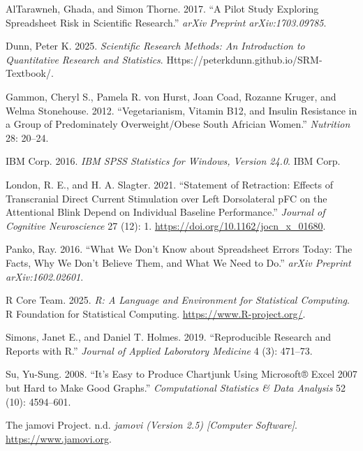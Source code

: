 \documentclass[
  11pt,
  a4paper,
]{krantz}
\newlength{\cslhangindent}
\newenvironment{CSLReferences}[2] %
 {\begin{list}{}{%
  \setlength{\itemindent}{0pt}
  \setlength{\leftmargin}{0pt}
  \setlength{\parsep}{0pt}
  \ifodd #1
   \setlength{\leftmargin}{\cslhangindent}
   \setlength{\itemindent}{-1\cslhangindent}
  \fi
  \setlength{\itemsep}{#2\baselineskip}}}
 {\end{list}}
\begin{document}
\protect{}\label{refs}
\begin{CSLReferences}{1}{1}
AlTarawneh, Ghada, and Simon Thorne. 2017. {``A Pilot Study Exploring Spreadsheet Risk in Scientific Research.''} \emph{arXiv Preprint arXiv:1703.09785}.

Dunn, Peter K. 2025. \emph{Scientific Research Methods: An Introduction to Quantitative Research and Statistics}. Https://peterkdunn.github.io/SRM-Textbook/.

{Gammon, Cheryl S., Pamela R. von Hurst, Joan Coad, Rozanne Kruger, and Welma Stonehouse}. 2012. {``Vegetarianism, Vitamin {B12}, and Insulin Resistance in a Group of Predominately Overweight/Obese {S}outh {A}frician Women.''} \emph{Nutrition} 28: 20--24.

IBM Corp. 2016. \emph{{IBM} {SPSS} Statistics for {W}indows, Version 24.0}. {IBM} Corp.

London, R. E., and H. A. Slagter. 2021. {``Statement of Retraction: {E}ffects of Transcranial Direct Current Stimulation over Left Dorsolateral {pFC} on the Attentional Blink Depend on Individual Baseline Performance.''} \emph{Journal of Cognitive Neuroscience} 27 (12): 1. \url{https://doi.org/10.1162/jocn_x_01680}.

Panko, Ray. 2016. {``What We Don't Know about Spreadsheet Errors Today: The Facts, Why We Don't Believe Them, and What We Need to Do.''} \emph{arXiv Preprint arXiv:1602.02601}.

R Core Team. 2025. \emph{R: A Language and Environment for Statistical Computing}. R Foundation for Statistical Computing. \url{https://www.R-project.org/}.

Simons, Janet E., and Daniel T. Holmes. 2019. {``Reproducible Research and Reports with {R}.''} \emph{Journal of Applied Laboratory Medicine} 4 (3): 471--73.

Su, Yu-Sung. 2008. {``It's Easy to Produce Chartjunk Using {M}icrosoft{®} {E}xcel 2007 but Hard to Make Good Graphs.''} \emph{Computational Statistics \& Data Analysis} 52 (10): 4594--601.

The jamovi Project. n.d. \emph{{jamovi} (Version 2.5) {[}Computer Software{]}}. \url{https://www.jamovi.org}.


\end{CSLReferences}
\end{document}
